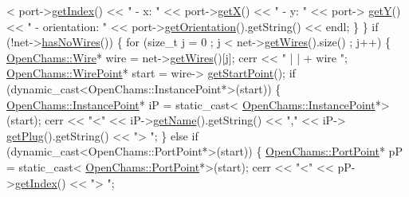 \begin{DoxyCodeInclude}
      < port->\mbox{\hyperlink{class_open_chams_1_1_port_a743f20da85b9a06d9984c0adc337afc1}{getIndex}}() << \textcolor{stringliteral}{" - x: "} << port->\mbox{\hyperlink{class_open_chams_1_1_port_a344385751bee0720059403940d57a13e}{getX}}() << \textcolor{stringliteral}{" - y: "} << port->
      \mbox{\hyperlink{class_open_chams_1_1_port_aafa51c7f8f38a09febbb9ce7853f77b4}{getY}}() << \textcolor{stringliteral}{" - orientation: "} << port->\mbox{\hyperlink{class_open_chams_1_1_port_ace51e4bf9cee0319600c14723efa0dfb}{getOrientation}}().getString() << endl;
                    \}
                \}
                \textcolor{keywordflow}{if} (!net->\mbox{\hyperlink{class_open_chams_1_1_net_ac9470e72b26d4cddef3d13e69057ee54}{hasNoWires}}()) \{
                    \textcolor{keywordflow}{for} (\textcolor{keywordtype}{size\_t} j = 0 ; j < net->\mbox{\hyperlink{class_open_chams_1_1_net_a2f8bcf7cad7711850efeca408f146b8a}{getWires}}().size() ; j++) \{
                        \mbox{\hyperlink{class_open_chams_1_1_wire}{OpenChams::Wire}}* wire = net->\mbox{\hyperlink{class_open_chams_1_1_net_a2f8bcf7cad7711850efeca408f146b8a}{getWires}}()[j];
                        cerr << \textcolor{stringliteral}{" | | + wire  "};
                        \mbox{\hyperlink{class_open_chams_1_1_wire_point}{OpenChams::WirePoint}}* start = wire->
      \mbox{\hyperlink{class_open_chams_1_1_wire_ad68ddfcb6d4cbbe3c06d03fb4350dcdb}{getStartPoint}}();
                        \textcolor{keywordflow}{if} (dynamic\_cast<OpenChams::InstancePoint*>(start)) \{
                            \mbox{\hyperlink{class_open_chams_1_1_instance_point}{OpenChams::InstancePoint}}* iP = \textcolor{keyword}{static\_cast<}
      \mbox{\hyperlink{class_open_chams_1_1_instance_point}{OpenChams::InstancePoint}}*\textcolor{keyword}{>}(start);
                            cerr << \textcolor{stringliteral}{"<"} << iP->\mbox{\hyperlink{class_open_chams_1_1_instance_point_a2858c0c4e8b5108f041237cf5a802029}{getName}}().getString() << \textcolor{stringliteral}{","} << iP->
      \mbox{\hyperlink{class_open_chams_1_1_instance_point_a646d464666fc56ab2e04a6b87fdd3279}{getPlug}}().getString() << \textcolor{stringliteral}{"> "};
                        \} \textcolor{keywordflow}{else} \textcolor{keywordflow}{if} (dynamic\_cast<OpenChams::PortPoint*>(start)) \{
                            \mbox{\hyperlink{class_open_chams_1_1_port_point}{OpenChams::PortPoint}}* pP = \textcolor{keyword}{static\_cast<}
      \mbox{\hyperlink{class_open_chams_1_1_port_point}{OpenChams::PortPoint}}*\textcolor{keyword}{>}(start);
                            cerr << \textcolor{stringliteral}{"<"} << pP->\mbox{\hyperlink{class_open_chams_1_1_port_point_ab4018980dcd1fed5208e7a72846cd815}{getIndex}}() << \textcolor{stringliteral}{"> "};

\end{DoxyCodeInclude}
